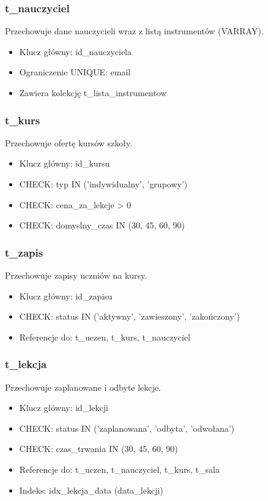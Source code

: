 \documentclass[12pt,a4paper]{article}
\begin{document}
\subsubsection{t\_nauczyciel}
Przechowuje dane nauczycieli wraz z listą instrumentów (VARRAY).
\begin{itemize}[nosep]
    \item Klucz główny: id\_nauczyciela
    \item Ograniczenie UNIQUE: email
    \item Zawiera kolekcję t\_lista\_instrumentow
\end{itemize}

\subsubsection{t\_kurs}
Przechowuje ofertę kursów szkoły.
\begin{itemize}[nosep]
    \item Klucz główny: id\_kursu
    \item CHECK: typ IN ('indywidualny', 'grupowy')
    \item CHECK: cena\_za\_lekcje > 0
    \item CHECK: domyslny\_czas IN (30, 45, 60, 90)
\end{itemize}

\subsubsection{t\_zapis}
Przechowuje zapisy uczniów na kursy.
\begin{itemize}[nosep]
    \item Klucz główny: id\_zapisu
    \item CHECK: status IN ('aktywny', 'zawieszony', 'zakończony')
    \item Referencje do: t\_uczen, t\_kurs, t\_nauczyciel
\end{itemize}

\subsubsection{t\_lekcja}
Przechowuje zaplanowane i odbyte lekcje.
\begin{itemize}[nosep]
    \item Klucz główny: id\_lekcji
    \item CHECK: status IN ('zaplanowana', 'odbyta', 'odwołana')
    \item CHECK: czas\_trwania IN (30, 45, 60, 90)
    \item Referencje do: t\_uczen, t\_nauczyciel, t\_kurs, t\_sala
    \item Indeks: idx\_lekcja\_data (data\_lekcji)
\end{itemize}
\end{document}
